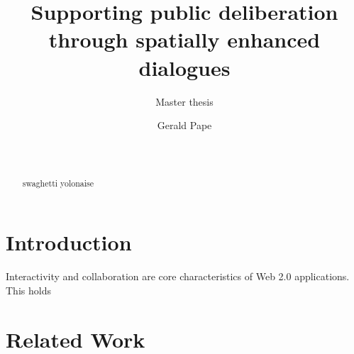 \documentclass{sigchi}
\begin{document}
\title{Supporting public deliberation\\through spatially enhanced dialogues}
\subtitle{Master thesis}

\author{
  \alignauthor Gerald Pape\\
    \\
    \\
}

\maketitle

\begin{abstract}
swaghetti yolonaise
\end{abstract}




\section{Introduction}

Interactivity and collaboration are core characteristics of Web 2.0 applications. This holds 


\section{Related Work}
\end{document}
